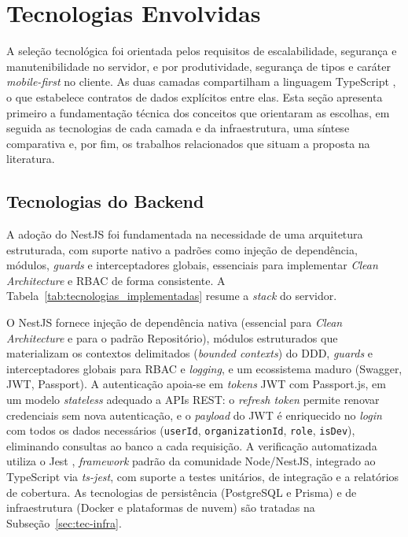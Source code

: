 \documentclass[12pt,openright,oneside,a4paper]{article}
\begin{document}
\section{Tecnologias Envolvidas}

A seleção tecnológica foi orientada pelos requisitos de escalabilidade, segurança e manutenibilidade no servidor, e por produtividade, segurança de tipos e caráter \textit{mobile-first} no cliente. As duas camadas compartilham a linguagem TypeScript \cite{typescript}, o que estabelece contratos de dados explícitos entre elas. Esta seção apresenta primeiro a fundamentação técnica dos conceitos que orientaram as escolhas, em seguida as tecnologias de cada camada e da infraestrutura, uma síntese comparativa e, por fim, os trabalhos relacionados que situam a proposta na literatura.



\subsection{Tecnologias do Backend}

A adoção do NestJS \cite{nestjs} foi fundamentada na necessidade de uma arquitetura estruturada, com suporte nativo a padrões como injeção de dependência, módulos, \textit{guards} e interceptadores globais, essenciais para implementar \textit{Clean Architecture} e RBAC de forma consistente. A Tabela~\ref{tab:tecnologias_implementadas} resume a \textit{stack} do servidor.



O NestJS fornece injeção de dependência nativa (essencial para \textit{Clean Architecture} e para o padrão Repositório), módulos estruturados que materializam os contextos delimitados (\textit{bounded contexts}) do DDD, \textit{guards} e interceptadores globais para RBAC e \textit{logging}, e um ecossistema maduro (Swagger, JWT, Passport). A autenticação apoia-se em \textit{tokens} JWT \cite{rfc7519} com Passport.js, em um modelo \textit{stateless} adequado a APIs REST: o \textit{refresh token} permite renovar credenciais sem nova autenticação, e o \textit{payload} do JWT é enriquecido no \textit{login} com todos os dados necessários (\texttt{userId}, \texttt{organizationId}, \texttt{role}, \texttt{isDev}), eliminando consultas ao banco a cada requisição. A verificação automatizada utiliza o Jest \cite{jest}, \textit{framework} padrão da comunidade Node/NestJS, integrado ao TypeScript via \textit{ts-jest}, com suporte a testes unitários, de integração e a relatórios de cobertura. As tecnologias de persistência (PostgreSQL e Prisma) e de infraestrutura (Docker e plataformas de nuvem) são tratadas na Subseção~\ref{sec:tec-infra}.
\end{document}
